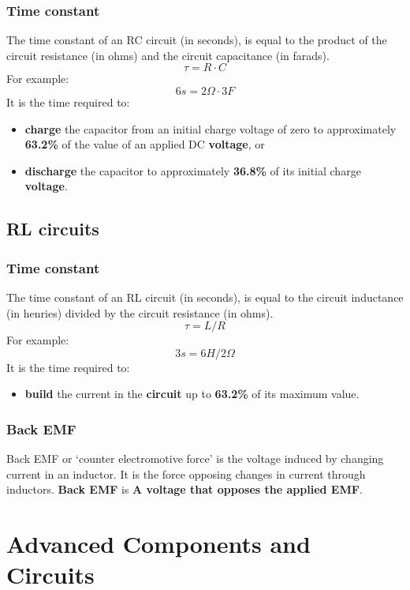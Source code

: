 \documentclass[letterpaper]{article}
\begin{document}
        \subsubsection{Time constant}
        The time constant of an RC circuit (in seconds), is equal to the product of the circuit resistance (in ohms) and the circuit capacitance (in farads).
        $$ \tau = R \cdot C $$
        For example:
        $$ 6s = 2\Omega \cdot 3F $$
        It is the time required to:
        \begin{itemize}
            \item \textbf{charge} the capacitor from an initial charge voltage of zero to approximately \textbf{63.2\%} of the value of an applied DC \textbf{voltage}, or
            \item \textbf{discharge} the capacitor to approximately \textbf{36.8\%} of its initial charge \textbf{voltage}.
        \end{itemize}

        \subsection{RL circuits}
        \subsubsection{Time constant}
        The time constant of an RL circuit (in seconds), is equal to the circuit inductance (in henries) divided by the circuit resistance (in ohms).
        $$ \tau = L / R $$
        For example:
        $$ 3s = 6H / 2\Omega $$
        It is the time required to:
        \begin{itemize}
            \item \textbf{build} the current in the \textbf{circuit} up to \textbf{63.2\%} of its maximum value.
        \end{itemize}

        \subsubsection{Back EMF}
        Back EMF or `counter electromotive force' is the voltage induced by changing current in an inductor. It is the force opposing changes in current through inductors.
        \textbf{Back EMF} is \textbf{A voltage that opposes the applied EMF}.

    \section{Advanced Components and Circuits}
\end{document}
